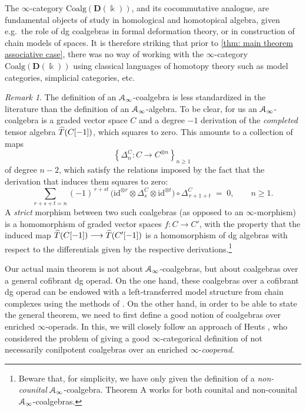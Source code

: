 \documentclass{proc-l}
\renewcommand{\mathcal}{\EuScript}
\theoremstyle{plain}
\theoremstyle{definition}
\theoremstyle{remark}
\newtheorem{remark}[{theorem}]{Remark}
\newcommand{\kk}{\Bbbk}
\begin{document}
The $\infty$-category $\mathrm{Coalg}(\mathbf D(\kk))$, and its cocommutative analogue, are fundamental objects of study in homological and homotopical algebra, given e.g.\ the role of dg coalgebras in formal deformation theory, or in construction of chain models of spaces. It is therefore striking that prior to \cref{thm: main theorem associative case}, there was no way of working with the $\infty$-category $\mathrm{Coalg}(\mathbf D(\kk))$ using classical languages of homotopy theory such as model categories, simplicial categories, etc.

\begin{remark}%
\label{Remark:1.8}The definition of an $\mathcal A_\infty$-coalgebra is less standardized in the literature than the definition of an $\mathcal A_\infty$-algebra. To be clear, for us an $\mathcal A_\infty$-coalgebra is a graded vector space $C$ and a degree $-1$ derivation of the \emph{completed} tensor algebra $\smash{\widehat T}(C[-1])$, which squares to zero. This amounts to a collection of maps
\[
\left\{ \Delta_n^C: C \longrightarrow C^{\otimes n} \right\}_{n \geq 1}~
\]
of degree $n-2$, which satisfy the relations imposed by the fact that the derivation that induces them squares to zero:
\[
\sum_{r+s+t = n}
(-1)^{\,r + s t}\,
\bigl(
\mathrm{id}^{\otimes r}
\otimes \Delta_s^C
\otimes \mathrm{id}^{\otimes t}
\bigr)
\circ \Delta_{\,r+1+t}^C
\;=\; 0,
\qquad n \ge 1 .
\]
A \emph{strict} morphism between two such coalgebras (as opposed to an $\infty$-morphism) is a homomorphism of graded vector spaces $f: C \longrightarrow C'$, with the property that the induced map $\smash{\widehat T}(C[-1]) \longrightarrow \smash{\widehat T}(C'[-1])$ is a homomorphism of dg algebras with respect to the differentials given by the respective derivations.\footnote{Beware that, for simplicity, we have only given the definition of a \textit{non-counital}  $\mathcal A_\infty$-coalgebra. Theorem A works for both counital and non-counital $\mathcal A_\infty$-coalgebras.}
\end{remark}

Our actual main theorem is not about $\mathcal A_\infty$-coalgebras, but about coalgebras over a general cofibrant dg operad. On the one hand, these coalgebras over a cofibrant dg operad can be endowed with a left-transferred model structure from chain complexes using the methods of \cite{BHKKRS, HKRS, GKR}. On the other hand, in order to be able to state the general theorem, we need to first define a good notion of coalgebras over enriched $\infty$-operads.
In this, we will closely follow an approach of Heuts \cite[Appendix A]{heuts2024}, who considered the problem of giving a good $\infty$-categorical definition of not necessarily conilpotent coalgebras over an enriched $\infty$-\emph{cooperad}.
\end{document}
